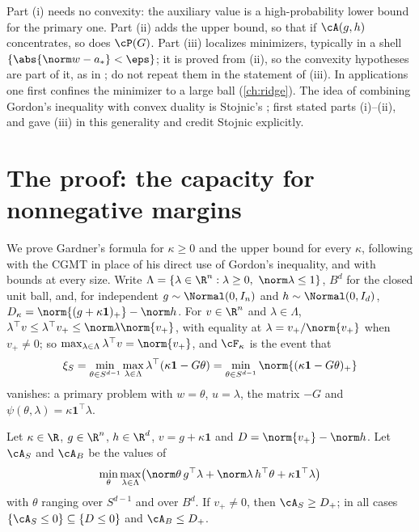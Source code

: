 \begin{refsection}
\begin{remark}\label{rem:gordon:use}
Part (i) needs no convexity: the auxiliary value is a high-probability lower bound for the primary one. Part (ii) adds the upper bound, so that if $\cA(g,h)$ concentrates, so does $\cP(G)$. Part (iii) localizes minimizers, typically in a shell $\{\abs{\norm w-a_*}<\eps\}$; it is proved from (ii), so the convexity hypotheses are part of it, as in \textcite[Theorem~3]{ThrampoulidisOymakHassibi2015}; \textcite{ThrampoulidisAbbasiHassibi2018} do not repeat them in the statement of (iii). In applications one first confines the minimizer to a large ball (\cref{ch:ridge}). The idea of combining Gordon's inequality with convex duality is Stojnic's \parencite{Stojnic2013d}; \textcite{ThrampoulidisOymakHassibi2015} first stated parts (i)--(ii), and \textcite{ThrampoulidisAbbasiHassibi2018} gave (iii) in this generality and credit Stojnic explicitly.
\end{remark}

\section{The proof: the capacity for nonnegative margins}\label{sec:gordon:capacity}

We prove Gardner's formula for $\kappa\ge0$ and the upper bound for every $\kappa$, following \textcite{Stojnic2013a} with the CGMT in place of his direct use of Gordon's inequality, and with bounds at every size. Write $\Lambda=\{\lambda\in\R^n:\lambda\ge0,\ \norm\lambda\le1\}$, $B^d$ for the closed unit ball, and, for independent $g\sim\Normal(0,I_n)$ and $h\sim\Normal(0,I_d)$, $D_\kappa=\norm{(g+\kappa\mathbf 1)_+}-\norm h$. For $v\in\R^n$ and $\lambda\in\Lambda$, $\lambda^\top v\le\lambda^\top v_+\le\norm\lambda\norm{v_+}$, with equality at $\lambda=v_+/\norm{v_+}$ when $v_+\ne0$; so $\max_{\lambda\in\Lambda}\lambda^\top v=\norm{v_+}$, and $\cF_\kappa$ is the event that
\begin{equation}\label{eq:gordon:xi}
\xi_S=\min_{\theta\in S^{d-1}}\max_{\lambda\in\Lambda}\lambda^\top(\kappa\mathbf 1-G\theta)=\min_{\theta\in S^{d-1}}\norm{(\kappa\mathbf 1-G\theta)_+}
\end{equation}
vanishes: a primary problem with $w=\theta$, $u=\lambda$, the matrix $-G$ and $\psi(\theta,\lambda)=\kappa\mathbf 1^\top\lambda$.

\begin{lemma}\label{lem:gordon:ao}
Let $\kappa\in\R$, $g\in\R^n$, $h\in\R^d$, $v=g+\kappa\mathbf 1$ and $D=\norm{v_+}-\norm h$. Let $\cA_S$ and $\cA_B$ be the values of
\[
\min_\theta\max_{\lambda\in\Lambda}\bigl(\norm\theta\,g^\top\lambda+\norm\lambda\,h^\top\theta+\kappa\mathbf 1^\top\lambda\bigr)
\]
with $\theta$ ranging over $S^{d-1}$ and over $B^d$. If $v_+\ne0$, then $\cA_S\ge D_+$; in all cases $\{\cA_S\le0\}\subseteq\{D\le0\}$ and $\cA_B\le D_+$.
\end{lemma}


\end{refsection}
